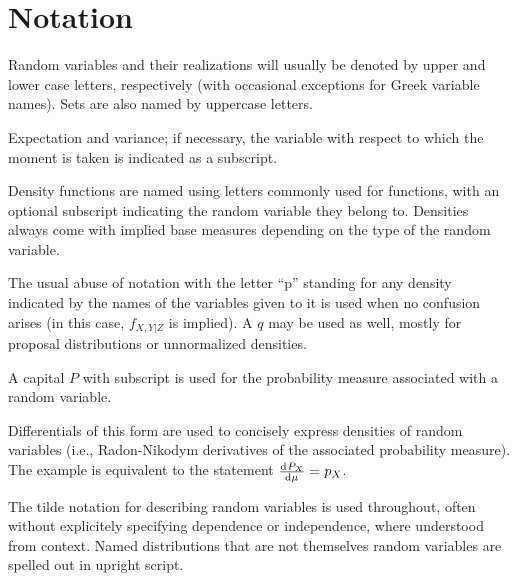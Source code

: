 \chapter*{Notation}
\label{cha:notation}

\begin{symbolicfootnotes}
  \begin{description}[style=nextline, leftmargin=4cm]
  \item[\(\Prob{\Theta \in A \given X = x}\)] Random variables and their realizations will usually be
    denoted by upper and lower case letters, respectively (with occasional exceptions for Greek
    variable names).  Sets are also named by uppercase letters.
  \item[{\(\Exp{X}, \Var[X]{f(X, Y)}\)}] Expectation and variance; if necessary, the variable with
    respect to which the moment is taken is indicated as a subscript.
  \item[\(\phi(x), f_{Z}(x)\)] Density functions are named using letters commonly used for functions,
    with an optional subscript indicating the random variable they belong to.  Densities always come
    with implied base measures depending on the type of the random variable.
  \item[\(\prob{x, y \given z}\)] The usual abuse of notation with the letter \enquote{p} standing for
    any density indicated by the names of the variables given to it is used when no confusion arises
    (in this case, \(f_{X,Y|Z}\) is implied).  A \(q\) may be used as well, mostly for proposal
    distributions or unnormalized densities.
  \item[{\(\Prob{X \in A} = P_{X}(A) = \int_{A} p_{X}(x) \dif\mu(x)\)}] A capital \(P\) with subscript
    is used for the probability measure associated with a random variable.
  \item[\(\Prob{X \in \dif x} = p_{X}(x) \dif\mu(x)\)] Differentials of this form are used to
    concisely express densities of random variables (i.e., Radon-Nikodym derivatives of the
    associated probability measure).  The example is equivalent to the statement
    \(\od{P_{X}}{\mu} = p_{X}\).
  \item[{\(X_{i} \from \distr{Normal}(\mu, \sigma)\)}] The tilde notation for describing random
    variables is used throughout, often without explicitely specifying dependence or independence,
    where understood from context.  Named distributions that are not themselves random variables are
    spelled out in upright script.

\end{description}
\end{symbolicfootnotes}
